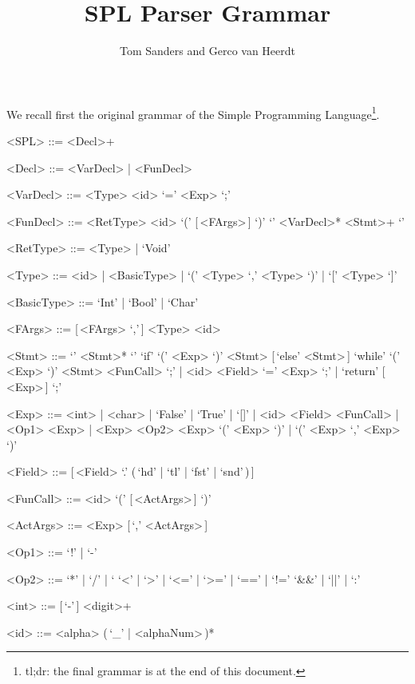 \documentclass{article}
\title{SPL Parser Grammar}
\author{Tom Sanders and Gerco van Heerdt}
\begin{document}
\maketitle

We recall first the original grammar of the Simple Programming Language\footnote{%
    tl;dr: the final grammar is at the end of this document.
}.
\setlength{\grammarindent}{6.8em}
\begin{grammar}
    <SPL> ::= <Decl>+

    <Decl> ::= <VarDecl> | <FunDecl>

    <VarDecl> ::= <Type> <id> `=' <Exp> `;'

    <FunDecl> ::= <RetType> <id> `(' [\,<FArgs>\,] `)' `{' <VarDecl>* <Stmt>+ `}'

    <RetType> ::= <Type> | `Void'

    <Type> ::= <id> | <BasicType> | `(' <Type> `,' <Type> `)' | `[' <Type> `]'

    <BasicType> ::= `Int' | `Bool' | `Char'

    <FArgs> ::= [\,<FArgs> `,'\,] <Type> <id>

    <Stmt> ::= `{' <Stmt>* `}'
    \alt `if' `(' <Exp> `)' <Stmt> [\,`else' <Stmt>\,]
    \alt `while' `(' <Exp> `)' <Stmt>
    \alt <FunCall> `;' | <id> <Field> `=' <Exp> `;' | `return' [\,<Exp>\,] `;'

    <Exp> ::= <int> | <char> | `False' | `True' | `[]' | <id> <Field>
    \alt <FunCall> | <Op1> <Exp> | <Exp> <Op2> <Exp>
    \alt `(' <Exp> `)' | `(' <Exp> `,' <Exp> `)'

    <Field> ::= [\,<Field> `.' (\,`hd' | `tl' | `fst' | `snd'\,)\,]

    <FunCall> ::= <id> `(' [\,<ActArgs>\,] `)'

    <ActArgs> ::= <Exp> [\,`,' <ActArgs>\,]

    <Op1> ::= `!' | `-'

    <Op2> ::=  `*' | `/' | `%
    \alt `<' | `>' | `<=' | `>=' | `==' | `!='
    \alt `&&' | `||' | `:'

    <int> ::= [\,`-'\,] <digit>+

    <id> ::= <alpha> (\,`_' | <alphaNum>\,)*
\end{grammar}
\end{document}
